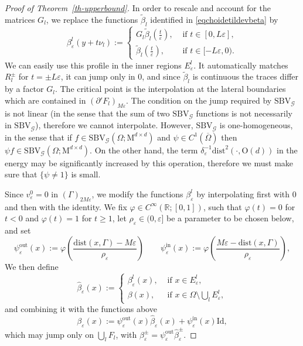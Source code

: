 \documentclass[a4paper,reqno]{amsart}
\newcommand\R{\mathbb{R}}
\newcommand{\SBVG}{\mathrm{SBV}_{\mathcal{G}}}
\newcommand\dist{{\mathrm{dist}}}
\newcommand\Id{{\mathrm{Id}}}
\newcommand\out{{\mathrm{out}}}
\newcommand\iin{{\mathrm{in}}}
\newcommand\eps{{\varepsilon}}
\theoremstyle{remark}
\newcommand{\On}{\mathrm{O}(d)}
\newcommand{\Mno}{\mathrm{M}^{d\times d}}
\numberwithin{equation}{section}
\begin{document}
\begin{proof}[Proof of Theorem~\ref{th-upperbound}]
	In order to rescale and account for the matrices $G_l$, we replace the functions $\widetilde\beta_l$ identified in \eqref{eqchoidetildevbeta} by
	\begin{equation}\label{eqconstrbeta1}
		 \beta^l_\eps(y+t\nu_l):=
		\begin{cases}
			G_l\widetilde \beta_l(\frac{t}{\eps}), &\text{ if } t\in[0,L\eps],\\
			\widetilde \beta_l(\frac{t}{\eps}), &\text{ if } t\in [-L\eps,0).
		\end{cases}
	\end{equation}
	We can  easily use this profile in the inner regions $E^l_\eps$. It automatically matches $R_l^\pm$ for $t =\pm  L\eps$, it can jump only in 0,
	and since $\widetilde \beta_l$ is continuous the traces differ by a factor $G_l$.
	The critical point is the interpolation at the lateral boundaries which are contained in $(\partial' F_l)_{M\eps}$.
	The condition on the jump required by $\SBVG$  is not linear (in the sense that the sum of two $\SBVG$ functions is not necessarily in $\SBVG$), therefore we cannot interpolate.
	However, $\SBVG$ is one-homogeneous, in the sense that
	if $f\in \SBVG(\Omega;\Mno)$ and $\psi\in C^1(\overline \Omega)$ then
	$\psi f\in \SBVG(\Omega;\Mno)$. On the other hand, the
	term $\delta_\eps^{-1}\dist^2(\cdot,\On)$ in the energy may be significantly increased by this operation, therefore we must make sure that $\{\psi\ne1\}$ is small.
		
	Since $v_\eps^0=0$ in $(\Gamma)_{2M\eps}$, we modify the functions $\beta^l_\eps$ by interpolating first with $0$ and then with the identity.
	We fix $\varphi\in C^\infty(\R;[0,1])$, such that $\varphi(t)=0$ for $t<0$ and $\varphi(t)=1$ for $t\geq1$, let $\rho_\eps\in(0,\eps]$ be a parameter to be chosen below, and set
	\begin{equation}
		\label{eq-cut-off}
		\psi^{\out}_\eps(x):=\varphi\left(\frac{\dist(x,\Gamma)-M\eps}{\rho_\eps}\right)\qquad \psi^\iin_\eps(x):=\varphi\left(\frac{M\eps-\dist(x,\Gamma)}{\rho_\eps}\right),
	\end{equation}
We then define
\begin{equation}\label{eqdefhatbetaeps}
		\widehat \beta_\eps(x):=
		\begin{cases} \beta^l_\eps(x), & \text{ if } x\in E^l_\eps,\\
			\beta(x),  & \text{ if } x\in \Omega\setminus \bigcup_lE^l_\eps,
		\end{cases}
	\end{equation}
	and combining it with the functions above 
	\begin{equation}
\label{eq-beta-finale}
\beta_\eps(x):=\psi^\out_\eps(x)	\widehat \beta_\eps(x) +\psi_\eps^\iin(x) \Id,
	\end{equation}
which may jump only on $\bigcup_l F_l$, with
$\beta_\eps^\pm=\psi^\out_\eps \widehat \beta_\eps^\pm$.


\end{proof}
\end{document}
